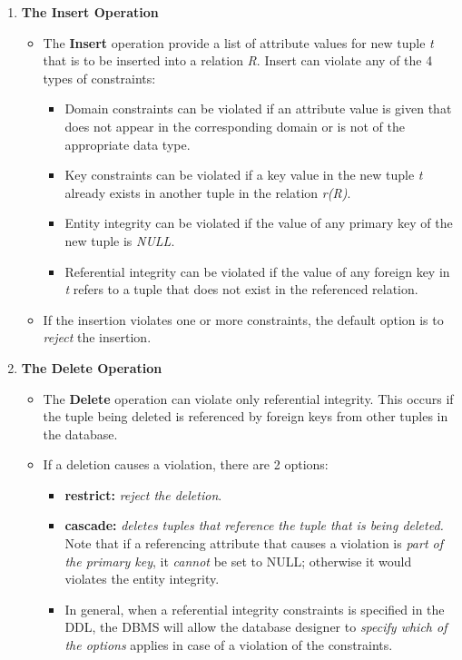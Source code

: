 \documentclass[10pt]{article}
\begin{document}
\begin{enumerate}
	\item \textbf{The Insert Operation}
	\begin{itemize}
		\item The \textbf{Insert} operation provide a list of attribute values for new tuple \textit{t} that is to be inserted into a relation \textit{R}. Insert can violate any of the 4 types of constraints:
		\begin{itemize}
			\item Domain constraints can be violated if an attribute value is given that does not appear in the corresponding domain or is not of the appropriate data type.
			\item Key constraints can be violated if a key value in the new tuple \textit{t} already exists in another tuple in the relation \textit{r(R)}.
			\item Entity integrity can be violated if the value of any primary key of the new tuple is \textit{NULL}.
			\item Referential integrity can be violated if the value of any foreign key in \textit{t} refers to a tuple that does not exist in the referenced relation.
		\end{itemize}

		\item If the insertion violates one or more constraints, the default option is to \textit{reject} the insertion.
	\end{itemize}

	\item \textbf{The Delete Operation}
	\begin{itemize}
		\item The \textbf{Delete} operation can violate only referential integrity. This occurs if the tuple being deleted is referenced by foreign keys from other tuples in the database.
		\item If a deletion causes a violation, there are 2 options:
		\begin{itemize}
			\item \textbf{restrict:} \textit{reject the deletion}.
			\item \textbf{cascade:} \textit{deletes tuples that reference the tuple that is being deleted.} Note that if a referencing attribute that causes a violation is \textit{part of the primary key}, it \textit{cannot} be set to NULL; otherwise it would violates the entity integrity.
			\item In general, when a referential integrity constraints is specified in the DDL, the DBMS will allow the database designer to \textit{specify which of the options} applies in case of a violation of the constraints. 
		\end{itemize}
	\end{itemize}


\end{enumerate}
\end{document}
